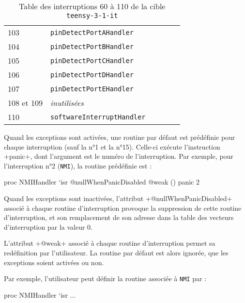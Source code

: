 \begin{table}[!t]
\begin{tabular}{llllll}
    103  & \texttt{pinDetectPortAHandler}\\
    104  & \texttt{pinDetectPortBHandler}\\
    105  & \texttt{pinDetectPortCHandler}\\
    106  & \texttt{pinDetectPortDHandler}\\
    107  & \texttt{pinDetectPortEHandler}\\
    108 et 109  & \emph{inutilisées} \\
    110  & \texttt{softwareInterruptHandler}
  \end{tabular}
  \caption{Table des interruptions 60 à 110 de la cible \texttt{teensy-3-1-it}}
  \ligne
\end{table}



Quand les exceptions sont activées, une routine par défaut est prédéfinie pour chaque interruption (sauf la n°1 et la n°15). Celle-ci exécute l'instruction \plm+panic+, dont l'argument est le numéro de l'interruption. Par exemple, pour l'interruption n°2 (\texttt{NMI}), la routine prédéfinie est :
\begin{PLM}[1]
proc NMIHandler `isr @nullWhenPanicDisabled @weak () {
  panic 2
}
\end{PLM}



Quand les exceptions sont inactivées, l'attribut \plm+@nullWhenPanicDisabled+ associé à chaque routine d'interruption provoque la suppression de cette routine d'interruption, et son remplacement de son adresse dans la table des vecteurs d'interruption par la valeur $0$.




L'attribut \plm+@weak+ associé à chaque routine d'interruption permet sa redéfinition par l'utilisateur. La routine par défaut est alors ignorée, que les exceptions soient activées ou non.

Par exemple, l'utilisateur peut définir la routine associée à \texttt{NMI} par :
\begin{PLM}[1]
proc NMIHandler `isr {
  ...
}
\end{PLM}

